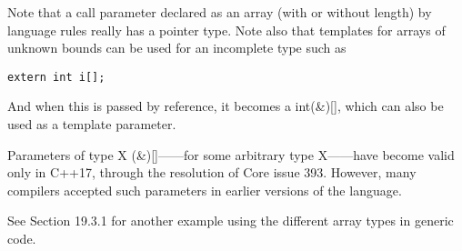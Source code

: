 Note that a call parameter declared as an array (with or without length) by language rules really has a pointer type. Note also that templates for arrays of unknown bounds can be used for an incomplete type such as

\begin{lstlisting}[style=styleCXX]
extern int i[];
\end{lstlisting}

And when this is passed by reference, it becomes a int(\&)[], which can also be used as a template parameter.

\begin{tcolorbox}[colback=webgreen!5!white,colframe=webgreen!75!black]
\hspace*{0.75cm}Parameters of type X (\&)[]——for some arbitrary type X——have become valid only in C++17, through the resolution of Core issue 393. However, many compilers accepted such parameters in earlier versions of the language.
\end{tcolorbox}

See Section 19.3.1 for another example using the different array types in generic code.

















